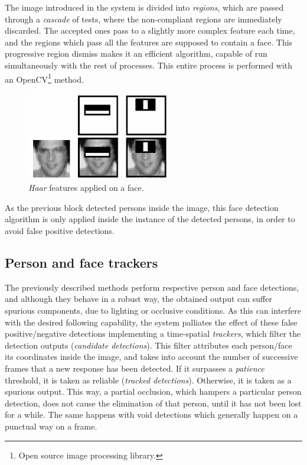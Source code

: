The image introduced in the system is divided into \emph{regions}, which are passed through a \emph{cascade} of tests, where the non-compliant regions are immediately discarded. The accepted ones pass to a slightly more complex feature each time, and the regions which pass all the features are supposed to contain a face. This progressive region dismiss makes it an efficient algorithm, capable of run simultaneously with the rest of processes. This entire process is performed with an OpenCV\footnote{Open source image processing library.} method.\\

\begin{figure}[h]
	\centering
	\includegraphics[width=2.5in]{images/haar_on_face}
	\caption{\emph{Haar} features applied on a face.}
	\label{fig:perception_haar}
\end{figure}


As the previous block detected persons inside the image, this face detection algorithm is only applied inside the instance of the detected persons, in order to avoid false positive detections.\\



\subsection{Person and face trackers}

The previously described methods perform respective person and face detections, and although they behave in a robust way, the obtained output can suffer spurious components, due to lighting or occlusive conditions. As this can interfere with the desired following capability, the system palliates the effect of these false positive/negative detections implementing a time-spatial \emph{trackers}, which filter the detection outputs (\emph{candidate detections}). This filter attributes each person/face its coordinates inside the image, and takes into account the number of successive frames that a new response has been detected. If it surpasses a \emph{patience} threshold, it is taken as reliable (\emph{tracked detections}). Otherwise, it is taken as a spurious output. This way, a partial occlusion, which hampers a particular person detection, does not cause the elimination of that person, until it has not been lost for a while. The same happens with void detections which generally happen on a punctual way on a frame.\\

